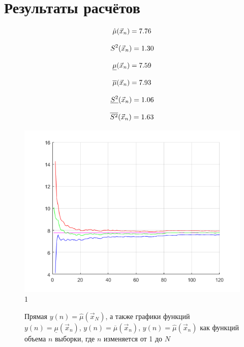 \documentclass[12pt]{report}
\begin{document}
\section*{Результаты расчётов}
\begin{equation*}
	\hat\mu(\vec x_n) = 7.76\\
\end{equation*}

\begin{equation*}
	S^2(\vec x_n) = 1.30\\
\end{equation*}

\begin{equation*}
	\underline\mu(\vec x_n) = 7.59\\
\end{equation*}

\begin{equation*}
	\overline\mu(\vec x_n) = 7.93\\
\end{equation*}

\begin{equation*}
	\underline{S^2}(\vec x_n) = 1.06\\
\end{equation*}

\begin{equation*}
	\overline{S^2}(\vec x_n) = 1.63\\
\end{equation*}

\begin{figure}[h]
	\centering
	\includegraphics[scale=1]{img/1.png}1
	\caption{Прямая $y(n) = \hat\mu(\vec x_N)$, а также графики функций $y(n) = \underline\mu(\vec x_n)$, $y(n) = \overline\mu(\vec x_n)$, $y(n) = \hat\mu(\vec x_n)$ как функций объема $n$ выборки, где $n$ изменяется от 1 до $N$}
	\label{fig:1}
\end{figure}
\end{document}

